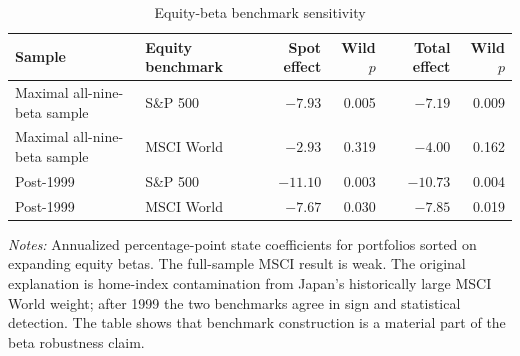 \begin{table}[H]
\centering
\caption{Equity-beta benchmark sensitivity}
\label{tab:beta-benchmark-sensitivity}
\small
\begin{tabular}{llrrrr}
\toprule
Sample & Equity benchmark & Spot effect & Wild $p$ & Total effect & Wild $p$ \\
\midrule
Maximal all-nine-beta sample & S\&P 500 & $-7.93$ & 0.005 & $-7.19$ & 0.009 \\
Maximal all-nine-beta sample & MSCI World & $-2.93$ & 0.319 & $-4.00$ & 0.162 \\
Post-1999 & S\&P 500 & $-11.10$ & 0.003 & $-10.73$ & 0.004 \\
Post-1999 & MSCI World & $-7.67$ & 0.030 & $-7.85$ & 0.019 \\
\bottomrule
\end{tabular}

\begin{minipage}{0.94\textwidth}
\footnotesize\emph{Notes:} Annualized percentage-point state coefficients for portfolios sorted on expanding equity betas. The full-sample MSCI result is weak. The original explanation is home-index contamination from Japan's historically large MSCI World weight; after 1999 the two benchmarks agree in sign and statistical detection. The table shows that benchmark construction is a material part of the beta robustness claim.
\end{minipage}
\end{table}

